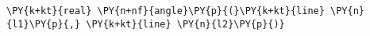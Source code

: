 \begin{Verbatim}[commandchars=\\\{\}]
    \PY{k+kt}{real} \PY{n+nf}{angle}\PY{p}{(}\PY{k+kt}{line} \PY{n}{l1}\PY{p}{,} \PY{k+kt}{line} \PY{n}{l2}\PY{p}{)}
\end{Verbatim}
